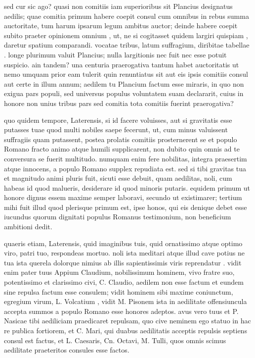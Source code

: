  sed cur sic ago? quasi non comitiis iam superioribus sit Plancius designatus aedilis; quae comitia primum habere coepit consul cum omnibus in rebus summa auctoritate, tum harum ipsarum legum ambitus auctor; deinde habere coepit subito praeter opinionem omnium , ut, ne si cogitasset quidem largiri quispiam , daretur spatium comparandi. vocatae tribus, latum suffragium, diribitae tabellae . longe plurimum valuit Plancius; nulla largitionis nec fuit nec esse potuit suspicio. ain tandem? una centuria praerogativa tantum habet auctoritatis ut nemo umquam prior eam tulerit quin renuntiatus sit aut eis ipsis comitiis consul aut certe in illum annum; aedilem tu Plancium factum esse miraris, in quo non exigua pars populi, sed universus populus voluntatem suam declararit, cuius in honore non unius tribus pars sed comitia tota comitiis fuerint praerogativa?

 quo quidem tempore, Laterensis, si id facere voluisses, aut si gravitatis esse putasses tuae quod multi nobiles saepe fecerunt, ut, cum minus valuissent suffragiis quam putassent, postea prolatis comitiis prosternerent se et populo Romano fracto animo atque humili supplicarent, non dubito quin omnis ad te conversura se fuerit multitudo. numquam enim fere nobilitas, integra praesertim atque innocens, a populo Romano supplex repudiata est. sed si tibi gravitas tua et magnitudo animi pluris fuit, sicuti esse debuit, quam aedilitas, noli, cum habeas id quod malueris, desiderare id quod minoris putaris. equidem primum ut honore dignus essem maxime semper laboravi, secundo ut existimarer; tertium mihi fuit illud quod plerisque primum est, ipse honos, qui eis denique debet esse iucundus quorum dignitati populus Romanus testimonium, non beneficium ambitioni dedit.

 quaeris etiam, Laterensis, quid imaginibus tuis, quid ornatissimo atque optimo viro, patri tuo, respondeas mortuo. noli ista meditari atque illud cave potius ne tua ista querela dolorque nimius ab illis sapientissimis viris reprendatur . vidit enim pater tuus Appium Claudium, nobilissimum hominem, vivo fratre suo, potentissimo et clarissimo civi, C. Claudio, aedilem non esse factum et eundem sine repulsa factum esse consulem; vidit hominem sibi maxime coniunctum, egregium virum, L. Volcatium , vidit M. Pisonem ista in aedilitate offensiuncula accepta summos a populo Romano esse honores adeptos. avus vero tuus et P. Nasicae tibi aediliciam praedicaret repulsam, quo cive neminem ego statuo in hac re publica fortiorem, et C. Mari, qui duabus aedilitatis acceptis repulsis septiens consul est factus, et L. Caesaris, Cn. Octavi, M. Tulli, quos omnis scimus aedilitate praeteritos consules esse factos.

